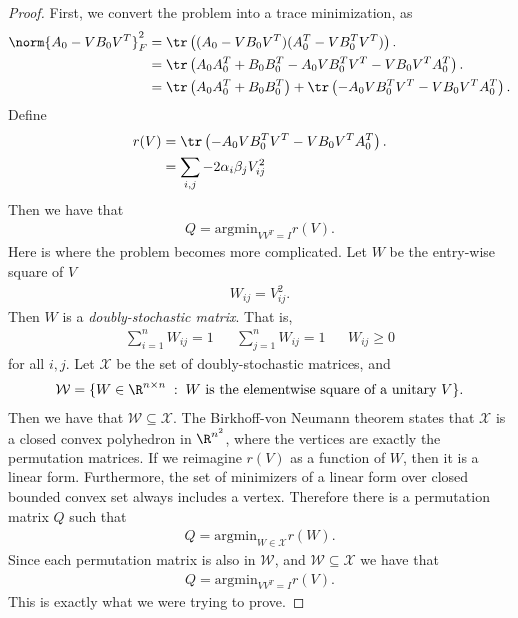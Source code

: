 \documentclass[12pt]{article}
\newcommand{\ga}[0]{\alpha}
\newcommand{\gb}[0]{\beta}
\begin{document}
\begin{proof}
  First, we convert the problem into a trace minimization, as
  \begin{align}
    \norm{A_0 - VB_0V^T}^2_F &= \tr\left((A_0 - VB_0V^T)(A_0^T -VB_0^TV^T)\right).\\
                             &= \tr\left(A_0A_0^T + B_0B_0^T - A_0VB_0^TV^T - VB_0V^TA_0^T \right).\\
                             &= \tr\left(A_0A_0^T + B_0B_0^T\right) + \tr\left(-A_0VB_0^TV^T - VB_0V^TA_0^T \right).
  \end{align}
  Define
  \begin{align}
    r(V) &= \tr\left(-A_0VB_0^TV^T - VB_0V^TA_0^T \right). \\
    &= \sum_{i,j} -2\ga_i\gb_jV_{ij}^2
  \end{align}
  Then we have that
  \begin{align}
    Q = \text{argmin}_{VV^T=I} r(V).
  \end{align}
  Here is where the problem becomes more complicated. Let $W$ be the entry-wise square of $V$
  \begin{align}
    W_{ij} = V_{ij}^2.
  \end{align}
  Then $W$ is a \emph{doubly-stochastic matrix}. That is,
  \begin{align}
    \sum_{i=1}^n W_{ij} = 1 & &\sum_{j=1}^n W_{ij} = 1& & W_{ij}\geq 0
  \end{align}
  for all $i,j$. Let $\mathcal{X}$ be the set of doubly-stochastic matrices, and
  \begin{align}
    \mathcal{W} = \{ W \in \R^{n\times n} \;:\; W\text{ is the elementwise square of a unitary } V\}.
  \end{align}
  Then we have that $\mathcal{W}\subseteq\mathcal{X}$. The Birkhoff-von Neumann theorem \cite{Birkhoff1946} states that $\mathcal{X}$ is a closed convex polyhedron in $\R^{n^2}$, where the vertices are exactly the permutation matrices. If we reimagine $r(V)$ as a function of $W$, then it is a linear form. Furthermore, the set of minimizers of a linear form over closed bounded convex set always includes a vertex. Therefore there is a permutation matrix $Q$ such that
  \begin{align}
    Q = \text{argmin}_{W\in \mathcal{X}}r(W).
  \end{align}
  Since each permutation matrix is also in $\mathcal{W}$, and $\mathcal{W}\subseteq \mathcal{X}$ we have that
  \begin{align}
    Q = \text{argmin}_{VV^T=I}r(V).
  \end{align}
  This is exactly what we were trying to prove.
\end{proof}
\end{document}
